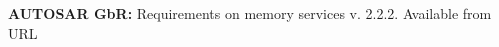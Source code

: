 \begin{thebibliography}{1}
{\bf AUTOSAR GbR:} Requirements on memory services v. 2.2.2. Available from URL 

\end{thebibliography}


